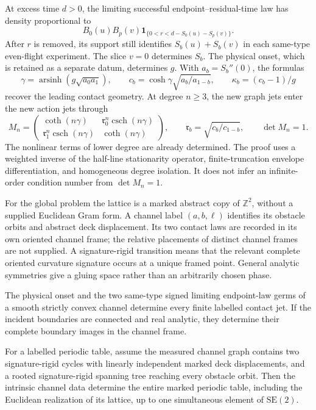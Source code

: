 At excess time \(d>0\), the limiting successful endpoint--residual-time
law has density proportional to
\[
       B_0(u)B_p(v)\mathbf1_{\{0<r<d-S_0(u)-S_p(v)\}}.
\]
After \(r\) is removed, its support still identifies
\(S_b(u)+S_b(v)\) in each same-type even-flight experiment.  The slice
\(v=0\) determines \(S_b\).  The physical onset, which is retained as a
separate datum, determines \(g\).  With \(a_b=S_b''(0)\), the formulas
\[
 \gamma=\operatorname{arsinh}(g\sqrt{a_0a_1}),\qquad
 c_b=\cosh\gamma\sqrt{a_b/a_{1-b}},\qquad
 \kappa_b=(c_b-1)/g
\]
recover the leading contact geometry.  At degree \(n\ge3\), the new graph
jets enter the new action jets through
\begin{equation}\label{eq:v25-intro-jet-block}
 M_n=\begin{pmatrix}
 \coth(n\gamma)&\mathfrak r_0^n\operatorname{csch}(n\gamma)\\
 \mathfrak r_1^n\operatorname{csch}(n\gamma)&\coth(n\gamma)
 \end{pmatrix},\qquad
 \mathfrak r_b=\sqrt{c_b/c_{1-b}},\qquad \det M_n=1.
\end{equation}
The nonlinear terms of lower degree are already determined.  The proof uses
a weighted inverse of the half-line stationarity operator, finite-truncation
envelope differentiation, and homogeneous degree isolation.  It does not
infer an infinite-order condition number from \(\det M_n=1\).

For the global problem the lattice is a marked abstract copy of
\(\mathbb Z^2\), without a supplied Euclidean Gram form.  A channel label
\((a,b,\ell)\) identifies its obstacle orbits and abstract deck displacement.
Its two contact laws are recorded in its own oriented channel frame; the
relative placements of distinct channel frames are not supplied.  A
signature-rigid transition means that the relevant complete oriented
curvature signature occurs at a unique framed point.  General analytic
symmetries give a gluing space rather than an arbitrarily chosen phase.

\begin{theorem}
\label{thm:v25-intro-rigidity}
The physical onset and the two same-type signed limiting endpoint-law germs
of a smooth strictly convex channel determine every finite labelled contact
jet.  If the incident boundaries are connected and real analytic, they
determine their complete boundary images in the channel frame.

For a labelled periodic table, assume the measured channel graph contains
two signature-rigid cycles with linearly independent marked deck
displacements, and a rooted signature-rigid spanning tree reaching every
obstacle orbit.  Then the intrinsic channel data determine the entire
marked periodic table, including the Euclidean realization of its lattice,
up to one simultaneous element of \(\mathrm{SE}(2)\).
\end{theorem}

